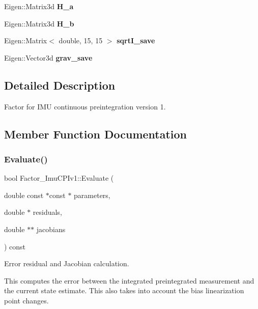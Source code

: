 \begin{DoxyCompactItemize}
Eigen\+::\+Matrix3d {\bfseries H\+\_\+a}
\item 
\mbox{\label{classov__init_1_1Factor__ImuCPIv1_ad25f44b13639e349dea37a3afcc2449b}} 
Eigen\+::\+Matrix3d {\bfseries H\+\_\+b}
\item 
\mbox{\label{classov__init_1_1Factor__ImuCPIv1_a0620f8c734cc1d0412278472987887ae}} 
Eigen\+::\+Matrix$<$ double, 15, 15 $>$ {\bfseries sqrt\+I\+\_\+save}
\item 
\mbox{\label{classov__init_1_1Factor__ImuCPIv1_a2bb9dc2ea616722dde853237772fc782}} 
Eigen\+::\+Vector3d {\bfseries grav\+\_\+save}
\end{DoxyCompactItemize}


\subsection{Detailed Description}
Factor for I\+MU continuous preintegration version 1. 

\subsection{Member Function Documentation}
\mbox{\label{classov__init_1_1Factor__ImuCPIv1_a76eebef0897757d9978af82b0f256f28}} 
\subsubsection{\texorpdfstring{Evaluate()}{Evaluate()}}
{\footnotesize\ttfamily bool Factor\+\_\+\+Imu\+C\+P\+Iv1\+::\+Evaluate (\begin{DoxyParamCaption}\item[{double const $\ast$const $\ast$}]{parameters,  }\item[{double $\ast$}]{residuals,  }\item[{double $\ast$$\ast$}]{jacobians }\end{DoxyParamCaption}) const\hspace{0.3cm}{\ttfamily [override]}}



Error residual and Jacobian calculation. 

This computes the error between the integrated preintegrated measurement and the current state estimate. This also takes into account the bias linearization point changes. 